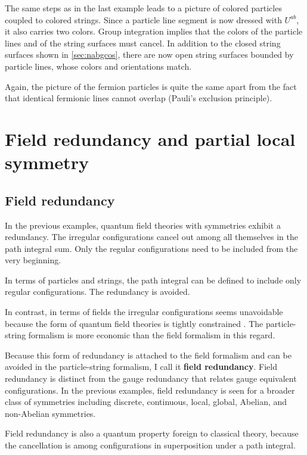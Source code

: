 \documentclass[12pt]{article}
\theoremstyle{definition}
\begin{document}
The same steps as in the last example leads to a picture of colored particles coupled to colored strings. Since a particle line segment is now dressed with $U^{ab}$, it also carries two colors. Group integration implies that the colors of the particle lines and of the string surfaces must cancel. In addition to the closed string surfaces shown in \cref{sec:nabgcos}, there are now open string surfaces bounded by particle lines, whose colors and orientations match. 

Again, the picture of the fermion particles \cite{Gattringer2018WorldlinesCycles, Marchis2018DualFluxes} is quite the same apart from the fact that identical fermionic lines cannot overlap (Pauli's exclusion principle).

\section{Field redundancy and partial local symmetry}\label{sec:fr}

\subsection{Field redundancy}

In the previous examples, quantum field theories with symmetries exhibit a redundancy. The irregular configurations cancel out among all themselves in the path integral sum. Only the regular configurations need to be included from the very beginning. 

In terms of particles and strings, the path integral can be defined to include only regular configurations. The redundancy is avoided. 

In contrast, in terms of fields the irregular configurations seems unavoidable because the form of quantum field theories is tightly constrained \cite{Weinberg1995TheFieldsb}. The particle-string formalism is more economic than the field formalism in this regard.

Because this form of redundancy is attached to the field formalism and can be avoided in the particle-string formalism, I call it \textbf{field redundancy}. Field redundancy is distinct from the gauge redundancy that relates gauge equivalent configurations. In the previous examples, field redundancy is seen for a broader class of symmetries including discrete, continuous, local, global, Abelian, and non-Abelian symmetries. 

Field redundancy is also a quantum property foreign to classical theory, because the cancellation is among configurations in superposition under a path integral.
\end{document}

